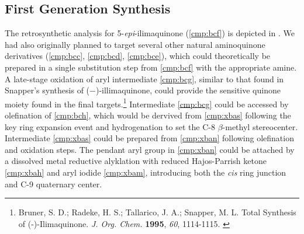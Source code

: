 \subsection{First Generation Synthesis}
The retrosynthetic analysis for 5-\textit{epi}-ilimaquinone (\ref{cmp:bcf}) is
depicted in . We had also
originally planned to target several other natural aminoquinone derivatives
(\ref{cmp:bcc}, \ref{cmp:bcd}, \ref{cmp:bce}), which could theoretically be prepared in a single
substitution step from \ref{cmp:bcf} with the appropriate amine. A late-stage oxidation of aryl
intermediate \ref{cmp:bcg}, similar to that found in Snapper's synthesis of ($-$)-illimaquinone,
could provide the sensitive quinone moiety found in the final targets.\footnote{{\frenchspacing
Bruner, S. D.; Radeke, H. S.; Tallarico, J. A.; Snapper, M. L. Total Synthesis of (-)-Ilimaquinone.
\textit{J. Org. Chem.} \textbf{1995}, \textit{60}, 1114-1115.} \label{ref:csnapper}} Intermediate
\ref{cmp:bcg} could be accessed by olefination of \ref{cmp:bch}, which would be dervived from
\ref{cmp:xbas} following the key ring expansion event and hydrogenation to set the C-8
$\beta$-methyl stereocenter. Intermediate \ref{cmp:xbas} could be prepared from \ref{cmp:xban}
following olefination and oxidation steps. The pendant aryl group in \ref{cmp:xban} could be
attached by a dissolved metal reductive alyklation with reduced Hajos-Parrish ketone \ref{cmp:xbah} and aryl
iodide \ref{cmp:xbam}, introducing both the \textit{cis} ring junction and C-9 quaternary center.

